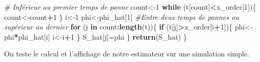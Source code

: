 \documentclass[
]{article}
\newenvironment{Shaded}{\begin{snugshade}}{\end{snugshade}}
\newcommand{\AttributeTok}[1]{\textcolor[rgb]{0.13,0.29,0.53}{#1}}
\newcommand{\CommentTok}[1]{\textcolor[rgb]{0.56,0.35,0.01}{\textit{#1}}}
\newcommand{\ControlFlowTok}[1]{\textcolor[rgb]{0.13,0.29,0.53}{\textbf{#1}}}
\newcommand{\DecValTok}[1]{\textcolor[rgb]{0.00,0.00,0.81}{#1}}
\newcommand{\FloatTok}[1]{\textcolor[rgb]{0.00,0.00,0.81}{#1}}
\newcommand{\FunctionTok}[1]{\textcolor[rgb]{0.13,0.29,0.53}{\textbf{#1}}}
\newcommand{\NormalTok}[1]{#1}
\newcommand{\OtherTok}[1]{\textcolor[rgb]{0.56,0.35,0.01}{#1}}
\newcommand{\SpecialCharTok}[1]{\textcolor[rgb]{0.81,0.36,0.00}{\textbf{#1}}}
\newcommand{\StringTok}[1]{\textcolor[rgb]{0.31,0.60,0.02}{#1}}
\begin{document}
\begin{Shaded}
\begin{Highlighting}[]
  \CommentTok{\# Inférieur au premier temps de panne}
\NormalTok{  count}\OtherTok{\textless{}{-}}\DecValTok{1}
  \ControlFlowTok{while}\NormalTok{ (t[count]}\SpecialCharTok{\textless{}}\NormalTok{x\_order[}\DecValTok{1}\NormalTok{])\{}
\NormalTok{    count}\OtherTok{\textless{}{-}}\NormalTok{count}\SpecialCharTok{+}\DecValTok{1}
\NormalTok{  \}}
\NormalTok{  i}\OtherTok{\textless{}{-}}\DecValTok{1}
\NormalTok{  phi}\OtherTok{\textless{}{-}}\NormalTok{phi\_hat[}\DecValTok{1}\NormalTok{]}
  \CommentTok{\#Entre deux temps de pannes ou supérieur au dernier}
  \ControlFlowTok{for}\NormalTok{ (j }\ControlFlowTok{in}\NormalTok{ count}\SpecialCharTok{:}\FunctionTok{length}\NormalTok{(t))\{}
    \ControlFlowTok{if}\NormalTok{ (t[j]}\SpecialCharTok{\textgreater{}}\NormalTok{x\_order[i}\SpecialCharTok{+}\DecValTok{1}\NormalTok{])\{}
\NormalTok{      phi}\OtherTok{\textless{}{-}}\NormalTok{phi}\SpecialCharTok{*}\NormalTok{phi\_hat[i]}
\NormalTok{      i}\OtherTok{\textless{}{-}}\NormalTok{i}\SpecialCharTok{+}\DecValTok{1}
\NormalTok{    \}}
\NormalTok{    S\_hat[j]}\OtherTok{=}\NormalTok{phi}
\NormalTok{  \}}
  \FunctionTok{return}\NormalTok{(S\_hat)}
\NormalTok{\}}
\end{Highlighting}
\end{Shaded}

On teste le calcul et l'affichage de notre estimateur sur une simulation
simple.

\begin{Shaded}
\end{Shaded}
\end{document}

